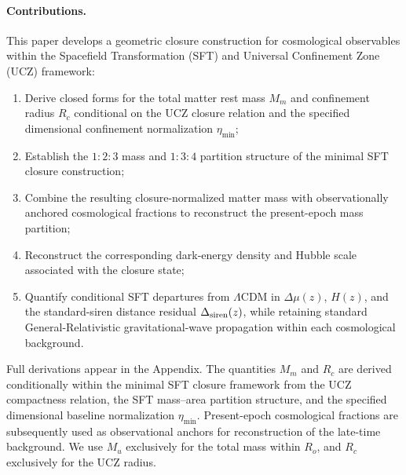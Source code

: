 \documentclass[12pt]{article}
\begin{document}

\paragraph{Contributions.}
This paper develops a geometric closure construction for cosmological observables within the 
Spacefield Transformation (SFT) and Universal Confinement Zone (UCZ) framework:
\begin{enumerate}

\item Derive closed forms for the total matter rest mass $M_m$ and
confinement radius $R_c$ conditional on the UCZ closure relation and
the specified dimensional confinement normalization $\eta_{\min}$;

\item Establish the $1{:}2{:}3$ mass and $1{:}3{:}4$ partition structure
of the minimal SFT closure construction;

\item Combine the resulting closure-normalized matter mass with
observationally anchored cosmological fractions to reconstruct the
present-epoch mass partition;

\item Reconstruct the corresponding dark-energy density and Hubble scale associated with the
closure state;

\item Quantify conditional SFT departures from $\Lambda$CDM in
$\Delta\mu(z)$, $H(z)$, and the standard-siren distance residual
$\Delta_{\rm siren}(z)$, while retaining standard General-Relativistic
gravitational-wave propagation within each cosmological background.

\end{enumerate}

Full derivations appear in the Appendix. The quantities $M_m$ and $R_c$
are derived conditionally within the minimal SFT closure framework from
the UCZ compactness relation, the SFT mass--area partition structure,
and the specified dimensional baseline normalization $\eta_{\min}$.
Present-epoch cosmological fractions are subsequently used as
observational anchors for reconstruction of the late-time background.
We use $M_u$ exclusively for the total mass within $R_o$, and $R_c$
exclusively for the UCZ radius.



\end{document}
